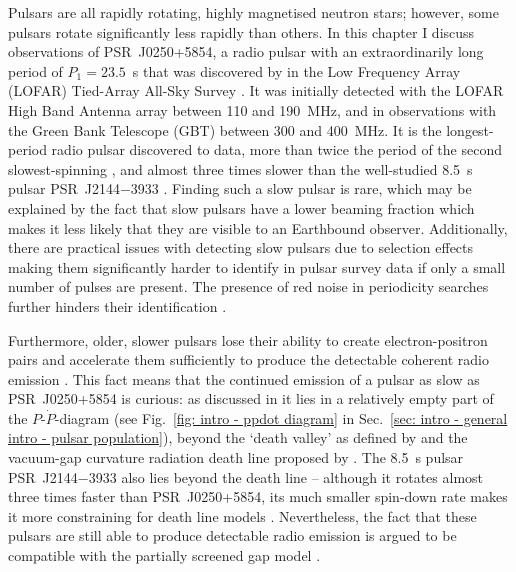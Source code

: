 Pulsars are all rapidly rotating, highly magnetised neutron stars; however, some pulsars rotate significantly less rapidly than others. In this chapter I discuss observations of PSR~J0250+5854, a radio pulsar with an extraordinarily long period of $P_1 = 23.5$~s that was discovered by \citet{TBC+2018} in the Low Frequency Array (LOFAR) Tied-Array All-Sky Survey \citep[LOTAAS;][]{SCB+2019}. It was initially detected with the LOFAR High Band Antenna array between 110 and 190~MHz, and in observations with the Green Bank Telescope (GBT) between 300 and 400~MHz. It is the longest-period radio pulsar discovered to data, more than twice the period of the second slowest-spinning \citep[PSR~J2251$-$3711 at $P_1 = 12.1$~s;][]{MKE+2020}, and almost three times slower than the well-studied 8.5~s pulsar PSR~J2144$-$3933 \citep{YMJx1999}. Finding such a slow pulsar is rare, which may be explained by the fact that slow pulsars have a lower beaming fraction \citep[the fraction of the sky covered by the radiation beam; e.g.][]{ECxx1989} which makes it less likely that they are visible to an Earthbound observer. Additionally, there are practical issues with detecting slow pulsars due to selection effects making them significantly harder to identify in pulsar survey data if only a small number of pulses are present. The presence of red noise in periodicity searches further hinders their identification \citep[e.g.][]{LBH+2015,HKRx2017}.

Furthermore, older, slower pulsars lose their ability to create electron-positron pairs and accelerate them sufficiently to produce the detectable coherent radio emission \citep{Sxxx1971}. This fact means that the continued emission of a pulsar as slow as PSR~J0250+5854 is curious: as discussed in \citet{TBC+2018} it lies in a relatively empty part of the $P$-$\dot{P}$-diagram (see Fig.~\ref{fig: intro - ppdot diagram} in Sec.~\ref{sec: intro - general intro - pulsar population}), beyond the `death valley' as defined by \citet{CRxx1993} and the vacuum-gap curvature radiation death line proposed by \citet{ZHMx2000}. The 8.5~s pulsar PSR~J2144$-$3933 also lies beyond the death line -- although it rotates almost three times faster than PSR~J0250+5854, its much smaller spin-down rate makes it more constraining for death line models \citep{MBMA2020}. Nevertheless, the fact that these pulsars are still able to produce detectable radio emission is argued to be compatible with the partially screened gap model \citep[e.g.][]{Sxxx2013}.

